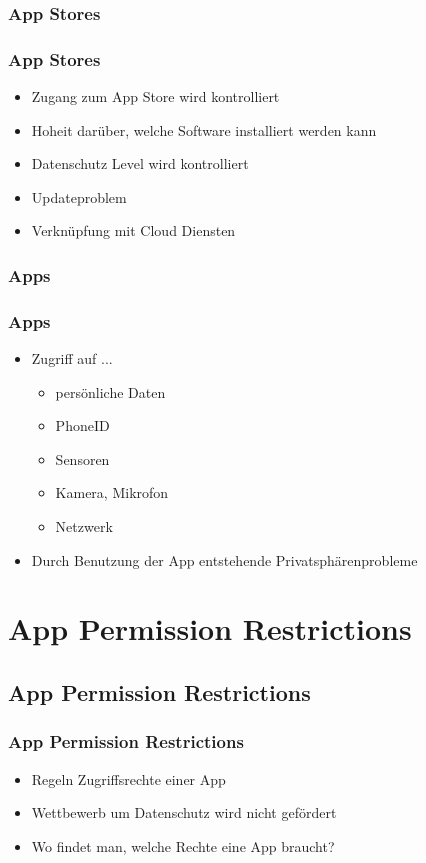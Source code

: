 \documentclass[12pt]{beamer}
\begin{document}
\subsubsection{App Stores}
\begin{frame}
	\frametitle{App Stores}
	\begin{itemize}
		\item<2-> Zugang zum App Store wird kontrolliert
		\item<3-> Hoheit darüber, welche Software installiert werden kann
		\item<4-> Datenschutz Level wird kontrolliert
		\item<5-> Updateproblem
		\item<6-> Verknüpfung mit Cloud Diensten
	\end{itemize}
\end{frame}

\subsubsection{Apps}
\begin{frame}
	\frametitle{Apps}
	\begin{itemize}
		\item<2-> Zugriff auf ...
		\begin{itemize}
			\item<3-> persönliche Daten
			\item<4-> PhoneID
			\item<5-> Sensoren
			\item<6-> Kamera, Mikrofon
			\item<7-> Netzwerk
		\end{itemize}
		\item<8-> Durch Benutzung der App entstehende Privatsphärenprobleme
	\end{itemize}
\end{frame}

\section{App Permission Restrictions}
\subsection{App Permission Restrictions}
\begin{frame}
	\frametitle{App Permission Restrictions}
	\begin{itemize}
		\item<2-> Regeln Zugriffsrechte einer App
		\item<3-> Wettbewerb um Datenschutz wird nicht gefördert
		\item<4-> Wo findet man, welche Rechte eine App braucht?
	\end{itemize}
\end{frame}
\end{document}
